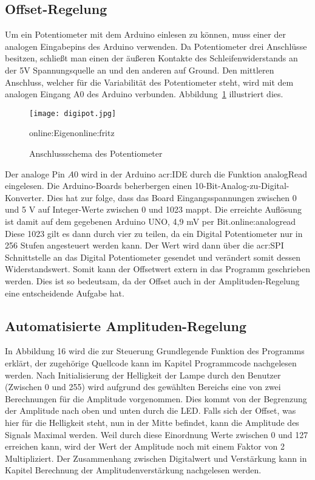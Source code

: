 \subsection{Offset-Regelung}
\label{subsec:offset}
Um ein Potentiometer mit dem Arduino einlesen zu können, muss einer der analogen Eingabepins des Arduino verwenden. Da Potentiometer drei Anschlüsse besitzen, schließt man einen der äußeren Kontakte des Schleifenwiderstands an der 5V Spannungsquelle an und den anderen auf Ground. Den mittleren Anschluss, welcher für die Variabilität des Potentiometer steht, wird mit dem analogen Eingang A0 des Arduino verbunden. Abbildung~\ref{fig:digipot} illustriert dies. 

\begin{figure}[H]
	\centering
	\texttt{[image: digipot.jpg]}
	\caption[Anschlussschema des Potentiometer]{Anschlussschema des Potentiometer} 
	\gls{online:Eigen}\gls{online:fritz}
	\label{fig:digipot}
\end{figure}

Der analoge Pin $A0$ wird in der Arduino \gls{acr:IDE} durch die Funktion analogRead eingelesen. Die Arduino-Boards beherbergen einen 10-Bit-Analog-zu-Digital-Konverter. Dies hat zur folge, dass das Board Eingangsspannungen zwischen 0 und 5 V auf Integer-Werte zwischen 0 und 1023 mappt. Die erreichte Auflösung ist damit auf dem gegebenen Arduino UNO, 4,9 mV per Bit.\gls{online:analogread} Diese 1023 gilt es dann durch vier zu teilen, da ein Digital Potentiometer nur in 256 Stufen angesteuert werden kann. Der Wert wird dann über die \gls{acr:SPI} Schnittstelle an das Digital Potentiometer gesendet und verändert somit dessen Widerstandswert. Somit kann der Offsetwert extern in das Programm geschrieben werden. Dies ist so bedeutsam, da der Offset auch in der Amplituden-Regelung eine entscheidende Aufgabe hat. 

\subsection{Automatisierte Amplituden-Regelung}
\label{subsec:autoamp}
In Abbildung 16 wird die zur Steuerung Grundlegende Funktion des Programms erklärt, der zugehörige Quellcode kann im Kapitel Programmcode nachgelesen werden. Nach Initialisierung der Helligkeit der Lampe durch den Benutzer (Zwischen 0 und 255) wird aufgrund des gewählten Bereichs eine von zwei Berechnungen für die Amplitude vorgenommen. Dies kommt von der Begrenzung der Amplitude nach oben und
unten durch die LED. Falls sich der Offset, was hier für die Helligkeit steht, nun in der Mitte
befindet, kann die Amplitude des Signals Maximal werden. Weil durch diese Einordnung Werte zwischen 0 und 127 erreichen kann, wird der Wert der Amplitude noch mit einem Faktor von 2 Multipliziert. Der Zusammenhang zwischen Digitalwert und Verstärkung  kann in Kapitel Berechnung der Amplitudenverstärkung nachgelesen werden.

